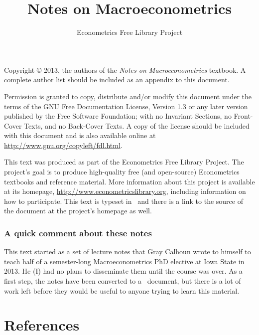 \documentclass{tex/tufte-handout}
\title{Notes on Macroeconometrics}
\author{Econometrics Free Library Project}
\begin{document}
\maketitle

\bigskip\noindent%
Copyright © 2013, the authors of the \textit{Notes on
  Macroeconometrics} textbook.  A complete author list should be
included as an appendix to this document.

Permission is granted to copy, distribute and/or modify this document
under the terms of the GNU Free Documentation License, Version 1.3 or
any later version published by the Free Software Foundation; with no
Invariant Sections, no Front-Cover Texts, and no Back-Cover Texts.  A
copy of the license should be included with this document and is also
available online at \url{http://www.gnu.org/copyleft/fdl.html}.

This text was produced as part of the Econometrics Free Library
Project.  The project's goal is to produce high-quality free (and
open-source) Econometrics textbooks and reference material.  More
information about this project is available at its homepage,
\url{http://www.econometricslibrary.org}, including information on how
to participate.  This text is typeset in \XeLaTeX\ and there is a link
to the source of the document at the project's homepage as well.

\tableofcontents

\section{A quick comment about these notes}
This text started as a set of lecture notes that Gray Calhoun wrote to
himself to teach half of a semester-long Macroeconometrics PhD
elective at Iowa State in 2013.  He (I) had no plans to disseminate
them until the course was over.  As a first step, the notes have been
converted to a \XeLaTeX\ document, but there is a lot of work left
before they would be useful to anyone trying to learn this material.






\appendix



\part*{References}

\end{document}
